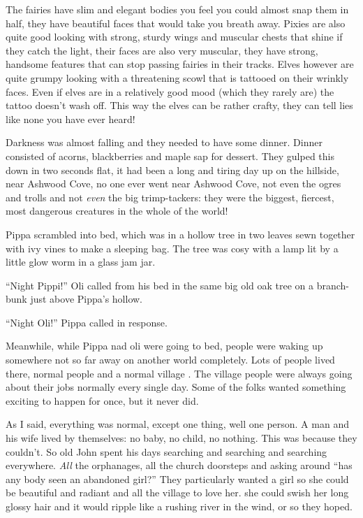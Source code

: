 The fairies have slim and elegant bodies you feel you could almost snap
them in half, they have beautiful faces that would take you breath away.
Pixies are also quite good looking with strong, sturdy wings and
muscular chests that shine if they catch the light, their faces are also
very muscular, they have strong, handsome features that can stop passing
fairies in their tracks. Elves however are quite grumpy looking with a
threatening scowl that is tattooed on their wrinkly faces. Even if elves
are in a relatively good mood (which they rarely are) the tattoo doesn't
wash off. This way the elves can be rather crafty, they can tell lies
like none you have ever heard!

Darkness was almost falling and they needed to have some dinner. Dinner
consisted of acorns, blackberries and maple sap for dessert. They gulped
this down in two seconds flat, it had been a long and tiring day up on
the hillside, near Ashwood Cove, no one ever went near Ashwood Cove, not
even the ogres and trolls and not \emph{even} the big trimp-tackers:
they were the biggest, fiercest, most dangerous creatures in the whole
of the world!

Pippa scrambled into bed, which was in a hollow tree in two leaves sewn
together with ivy vines to make a sleeping bag. The tree was cosy with a
lamp lit by a little glow worm in a glass jam jar.

``Night Pippi!'' Oli called from his bed in the same big old oak tree on
a branch-bunk just above Pippa's hollow.

``Night Oli!'' Pippa called in response.

Meanwhile, while Pippa nad oli were going to bed, people were waking up
somewhere not so far away on another world completely. Lots of people
lived there, normal people and a normal village . The village people
were always going about their jobs normally every single day. Some of
the folks wanted something exciting to happen for once, but it never
did.

As I said, everything was normal, except one thing, well one person. A
man and his wife lived by themselves: no baby, no child, no nothing.
This was because they couldn't. So old John spent his days searching and
searching and searching everywhere. \emph{All} the orphanages, all the
church doorsteps and asking around ``has any body seen an abandoned
girl?'' They particularly wanted a girl so she could be beautiful and
radiant and all the village to love her. she could swish her long glossy
hair and it would ripple like a rushing river in the wind, or so they
hoped.

